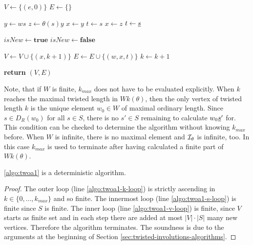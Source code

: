\begin{algo}[TWOA1]
	\hfill
	\begin{algorithmic}[1]
	\State $V \gets \{(e,0)\}$
	\State $E \gets \{\}$

	 \label{algo:twoa1-k-loop}
		 \label{algo:twoa1-v-loop}
			 \label{algo:twoa1-s-loop} 
				\State $y \gets ws$
				\State $z \gets \theta(s)y$
				 \label{algo:twoa1-check-one-or-bothsided}
					\State $x \gets y$
					\State $t \gets s$
				\Else
					\State $x \gets z$
					\State $t \gets \underline{s}$
				\EndIf
				
				\State $isNew \gets \textbf{true}$
				 \label{algo:twoa1-comp} 
						\State $isNew \gets \textbf{false}$
					\EndIf
				\EndFor
				
					\State $V \gets V \cup \{ (x,k+1) \}$
				\EndIf
				\State $E \gets E \cup \{ (w,x,t) \}$
			\EndFor
		\EndFor
		\State $k \gets k + 1$
	\EndFor

	\State \textbf{return} $(V,E)$
	\EndProcedure
	\end{algorithmic}
\end{algo}

Note, that if $W$ is finite, $k_{max}$ does not have to be evaluated explicitly. When $k$ reaches the maximal twisted length in $Wk(\theta)$, then the only vertex of twisted length $k$ is the unique element $w_0 \in W$ of maximal ordinary length. Since $s \in D_R(w_0)$ for all $s \in S$, there is no $s' \in S$ remaining to calculate $w_0 \underline{s}'$ for. This condition can be checked to determine the algorithm without knowing $k_{max}$ before. When $W$ is infinite, there is no maximal element and $\mathcal{I}_{\theta}$ is infinite, too. In this case $k_{max}$ is used to terminate after having calculated a finite part of $Wk(\theta)$.

\begin{lemm}
	\ref{algo:twoa1} is a deterministic algorithm.

	\begin{proof}
		The outer loop (line \ref{algo:twoa1-k-loop}) is strictly ascending in $k \in \{0,\ldots,k_{max}\}$ and so finite. The innermost loop (line \ref{algo:twoa1-s-loop}) is finite since $S$ is finite. The inner loop (line \ref{algo:twoa1-v-loop}) is finite, since $V$ starts as finite set and in each step there are added at most $|V| \cdot |S|$ many new vertices. Therefore the algorithm terminates. The soundness is due to the arguments at the beginning of Section \ref{sec:twisted-involutions-algorithms}.
	\end{proof}
\end{lemm}

